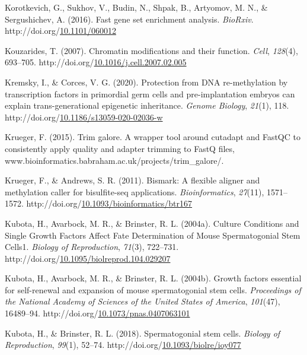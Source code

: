 \documentclass[12pt,twoside]{reedthesis}
\newlength{\cslhangindent}
\newenvironment{CSLReferences}[2] %
 {%
  \setlength{\parindent}{0pt}
  \ifodd #1 \everypar{\setlength{\hangindent}{\cslhangindent}}\ignorespaces\fi
  \ifnum #2 > 0
  \setlength{\parskip}{#2\baselineskip}
  \fi
 }%
 {}
\begin{document}
\begin{CSLReferences}{1}{0}
\leavevmode{}%
Korotkevich, G., Sukhov, V., Budin, N., Shpak, B., Artyomov, M. N., \& Sergushichev, A. (2016). Fast gene set enrichment analysis. \emph{BioRxiv}. http://doi.org/\href{https://doi.org/10.1101/060012}{10.1101/060012}

\leavevmode{}%
Kouzarides, T. (2007). Chromatin modifications and their function. \emph{Cell}, \emph{128}(4), 693--705. http://doi.org/\href{https://doi.org/10.1016/j.cell.2007.02.005}{10.1016/j.cell.2007.02.005}

\leavevmode{}%
Kremsky, I., \& Corces, V. G. (2020). Protection from DNA re-methylation by transcription factors in primordial germ cells and pre-implantation embryos can explain trans-generational epigenetic inheritance. \emph{Genome Biology}, \emph{21}(1), 118. http://doi.org/\href{https://doi.org/10.1186/s13059-020-02036-w}{10.1186/s13059-020-02036-w}

\leavevmode{}%
Krueger, F. (2015). Trim galore. A wrapper tool around cutadapt and FastQC to consistently apply quality and adapter trimming to FastQ files, www.bioinformatics.babraham.ac.uk/projects/trim{\_}galore/.

\leavevmode{}%
Krueger, F., \& Andrews, S. R. (2011). Bismark: A flexible aligner and methylation caller for bisulfite-seq applications. \emph{Bioinformatics}, \emph{27}(11), 1571--1572. http://doi.org/\href{https://doi.org/10.1093/bioinformatics/btr167}{10.1093/bioinformatics/btr167}

\leavevmode{}%
Kubota, H., Avarbock, M. R., \& Brinster, R. L. (2004a). Culture Conditions and Single Growth Factors Affect Fate Determination of Mouse Spermatogonial Stem Cells1. \emph{Biology of Reproduction}, \emph{71}(3), 722--731. http://doi.org/\href{https://doi.org/10.1095/biolreprod.104.029207}{10.1095/biolreprod.104.029207}

\leavevmode{}%
Kubota, H., Avarbock, M. R., \& Brinster, R. L. (2004b). Growth factors essential for self-renewal and expansion of mouse spermatogonial stem cells. \emph{Proceedings of the National Academy of Sciences of the United States of America}, \emph{101}(47), 16489--94. http://doi.org/\href{https://doi.org/10.1073/pnas.0407063101}{10.1073/pnas.0407063101}

\leavevmode{}%
Kubota, H., \& Brinster, R. L. (2018). Spermatogonial stem cells. \emph{Biology of Reproduction}, \emph{99}(1), 52--74. http://doi.org/\href{https://doi.org/10.1093/biolre/ioy077}{10.1093/biolre/ioy077}


\end{CSLReferences}
\end{document}
